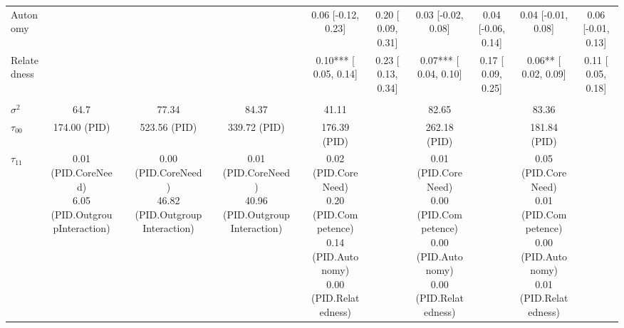 \begin{landscape}
\begin{table}
\begin{minipage}[t][\textheight][t]{\textwidth}
{\begin{tabular}[t]{lcccccccccccc}
\hspace{1em}Autonomy &  &  &  &  &  &  & 0.06 [-0.12,  0.23] & 0.20 [ 0.09, 0.31] & 0.03 [-0.02,  0.08] & 0.04 [-0.06, 0.14] & 0.04 [-0.01,  0.08] & 0.06 [-0.01, 0.13]\\
\hspace{1em}Relatedness &  &  &  &  &  &  & 0.10*** [ 0.05,  0.14] & 0.23 [ 0.13, 0.34] & 0.07*** [ 0.04,  0.10] & 0.17 [ 0.09, 0.25] & 0.06** [ 0.02,  0.09] & 0.11 [ 0.05, 0.18]\\
\addlinespace[0.3em]
\multicolumn{13}{l}{\textbf{Random}}\\
\hspace{1em}$\sigma^2$ & 64.7 &  & 77.34 &  & 84.37 &  & 41.11 &  & 82.65 &  & 83.36 & \\
\hspace{1em}$\tau_{00}$ & 174.00 (PID) &  & 523.56 (PID) &  & 339.72 (PID) &  & 176.39 (PID) &  & 262.18 (PID) &  & 181.84 (PID) & \\
\hspace{1em}$\tau_{11}$ & \makecell[c]{0.01 (PID.CoreNeed)\\6.05 (PID.OutgroupInteraction)} &  & \makecell[c]{ 0.00 (PID.CoreNeed)\\46.82 (PID.OutgroupInteraction)} &  & \makecell[c]{ 0.01 (PID.CoreNeed)\\40.96 (PID.OutgroupInteraction)} &  & \makecell[c]{0.02 (PID.CoreNeed)\\0.20 (PID.Competence)\\0.14 (PID.Autonomy)\\0.00 (PID.Relatedness)} &  & \makecell[c]{0.01 (PID.CoreNeed)\\0.00 (PID.Competence)\\0.00 (PID.Autonomy)\\0.00 (PID.Relatedness)} &  & \makecell[c]{0.05 (PID.CoreNeed)\\0.01 (PID.Competence)\\0.00 (PID.Autonomy)\\0.01 (PID.Relatedness)} & \\

\end{tabular}}
\end{minipage}
\end{table}
\end{landscape}
